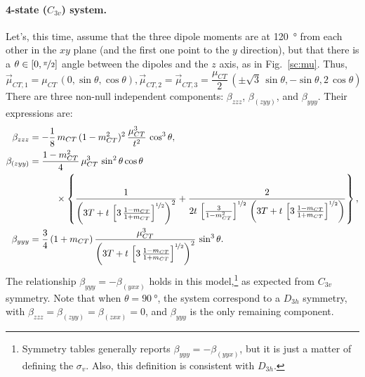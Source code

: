 \documentclass[12pt,a4paper]{article}
\begin{document}
\paragraph{4-state ($C_{3v}$) system.} Let's, this time, assume that the three dipole moments are at \SI{120}{\degree} from each other in the $xy$ plane (and the first one point to the $y$ direction), but that there is a $\theta\in[0,\nicefrac{\pi}{2}]$ angle between the dipoles and the $z$ axis, as in Fig.~\ref{sc:mu}. Thus,\begin{equation}
	\vec\mu_{CT,1} = \mu_{CT}\,(0,\sin\theta,\cos\theta), \vec\mu_{CT,2} = \vec\mu_{CT,3} = \frac{\mu_{CT}}{2}\,(\pm\sqrt{3}\,\sin\theta, -\sin\theta, 2\,\cos\theta)
\end{equation}
There are three non-null independent components: $\beta_{zzz}$,  $\beta_{(zyy)}$, and $\beta_{yyy}$. Their expressions are:\begin{align}
	\beta_{zzz} &= -\frac{1}{8}\,m_{CT}\,(1-m_{CT}^2)^2\,\frac{\mu^3_{CT}}{t^2}\,\cos^3\theta,\nonumber\\
	\beta_{(zyy)} &= \frac{1-m_{CT}^2}{4}\,\mu_{CT}^3\,\sin^2\theta\cos\theta\nonumber\\
	&\hspace{1cm}\times\left\{\frac{1}{\left(3T + t\,\left[3\,\frac{1-m_{CT}}{1+m_{CT}}\right]^{\nicefrac{1}{2}}\right)^2} + \frac{2}{2t\,\left[\frac{3}{1-m_{CT}^2}\right]^{\nicefrac{1}{2}}\,\left(3T + t\,\left[3\,\frac{1-m_{CT}}{1+m_{CT}}\right]^{\nicefrac{1}{2}}\right)}\right\},\nonumber\\
	\beta_{yyy} &= \frac{3}{4}\,(1+m_{CT})\,\frac{\mu_{CT}^3}{\left(3T + t\,\left[3\,\frac{1-m_{CT}}{1+m_{CT}}\right]^{\nicefrac{1}{2}}\right)^2}\,\sin^3\theta.\label{eq:4state}
\end{align}
The relationship $\beta_{yyy} = -\beta_{(yxx)}$ holds in this model,\footnote{Symmetry tables generally reports  $\beta_{yyy} = -\beta_{(yyx)}$, but it is just a matter of defining the $\sigma_v$. Also, this definition is consistent with $D_{3h}$.} as expected from $C_{3v}$ symmetry. Note that when $\theta=\SI{90}{°}$, the system correspond to a $D_{3h}$ symmetry, with $\beta_{zzz} = \beta_{(zyy)} = \beta_{(zxx)} = 0$, and $\beta_{yyy}$ is the only remaining component.
\end{document}
